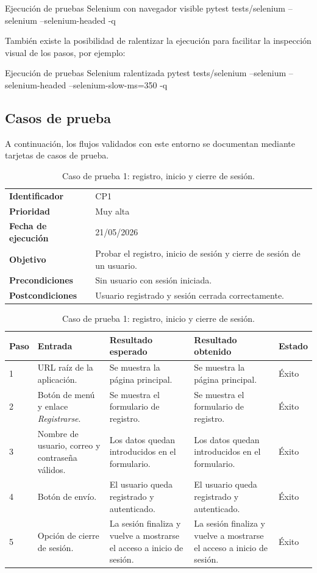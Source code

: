 \begin{testbox}{Ejecución de pruebas Selenium con navegador visible}
pytest tests/selenium --selenium --selenium-headed -q
\end{testbox}

También existe la posibilidad de ralentizar la ejecución para facilitar la inspección visual de los pasos, por ejemplo:

\begin{testbox}{Ejecución de pruebas Selenium ralentizada}
pytest tests/selenium --selenium --selenium-headed --selenium-slow-ms=350 -q
\end{testbox}

\subsection{Casos de prueba}

A continuación, los flujos validados con este entorno se documentan mediante tarjetas de casos de prueba.

\begin{table}[]
	\centering
	\footnotesize
	\renewcommand{\arraystretch}{1.2}
	\begin{tabularx}{\textwidth}{p{3.2cm} X}
		\toprule
		\textbf{Identificador} & CP1 \\
		\textbf{Prioridad} & Muy alta \\
		\textbf{Fecha de ejecución} & 21/05/2026 \\
		\textbf{Objetivo} & Probar el registro, inicio de sesión y cierre de sesión de un usuario. \\
		\textbf{Precondiciones} & Sin usuario con sesión iniciada. \\
		\textbf{Postcondiciones} & Usuario registrado y sesión cerrada correctamente. \\
		\midrule
	\end{tabularx}
	\begin{tabularx}{\textwidth}{p{0.8cm} p{3.2cm} X X p{1.3cm}}
		\textbf{Paso} & \textbf{Entrada} & \textbf{Resultado esperado} & \textbf{Resultado obtenido} & \textbf{Estado} \\
		\midrule
		1 & URL raíz de la aplicación. & Se muestra la página principal. & Se muestra la página principal. & Éxito \\
		2 & Botón de menú y enlace \textit{Registrarse}. & Se muestra el formulario de registro. & Se muestra el formulario de registro. & Éxito \\
		3 & Nombre de usuario, correo y contraseña válidos. & Los datos quedan introducidos en el formulario. & Los datos quedan introducidos en el formulario. & Éxito \\
		4 & Botón de envío. & El usuario queda registrado y autenticado. & El usuario queda registrado y autenticado. & Éxito \\
		5 & Opción de cierre de sesión. & La sesión finaliza y vuelve a mostrarse el acceso a inicio de sesión. & La sesión finaliza y vuelve a mostrarse el acceso a inicio de sesión. & Éxito \\
		\bottomrule
	\end{tabularx}
	\caption{Caso de prueba 1: registro, inicio y cierre de sesión.}
	\label{tab:cp1}
\end{table}

